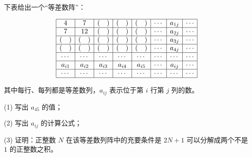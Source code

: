 \begin{question}
下表给出一个“等差数阵”：

\nopagebreak[4]
\[
\begin{array}{|c|c|c|c|c|c|c|c|}
\hline
4 & 7 & (\quad) & (\quad) & (\quad) & \cdots & a_{1j} & \cdots \\ \hline
7 & 12 & (\quad) & (\quad) & (\quad) & \cdots & a_{2j} & \cdots \\ \hline
(\quad) & (\quad) & (\quad) & (\quad) & (\quad) & \cdots & a_{3j} & \cdots \\ \hline
(\quad) & (\quad) & (\quad) & (\quad) & (\quad) & \cdots & a_{4j} & \cdots \\ \hline
\cdots & \cdots & \cdots & \cdots & \cdots & \cdots & \cdots & \cdots \\ \hline
a_{i1} & a_{i2} & a_{i3} & a_{i4} & a_{i5} & \cdots & a_{ij} & \cdots \\ \hline
\cdots & \cdots & \cdots & \cdots & \cdots & \cdots & \cdots & \cdots \\ \hline
\end{array}
\]

其中每行、每列都是等差数列，$a_{ij}$ 表示位于第 $i$ 行第 $j$ 列的数。

(1) 写出 $a_{45}$ 的值；

(2) 写出 $a_{ij}$ 的计算公式；

(3) 证明：正整数 $N$ 在该等差数列阵中的充要条件是 $2N+1$ 可以分解成两个不是 $1$ 的正整数之积。

\end{question}
